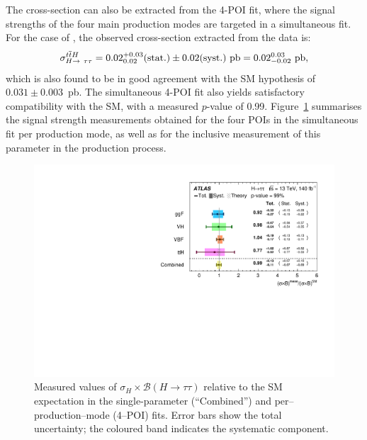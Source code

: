   The \ttHtt cross-section can also be extracted from the 4-POI fit, where the signal strengths of the four main production modes are targeted in a simultaneous fit. For the case of \ttH, the observed cross-section extracted from the data is:
\begin{equation}
  \sigma^{\ttH}_{H \to \tau \tau} 
  = 0.02^{+0.03}_{0.02}(\text{stat.}) \pm 0.02(\text{syst.})~\text{pb} 
  = 0.02^{0.03}_{-0.02}~\text{pb},
\end{equation}
which is also found to be in good agreement with the SM hypothesis of $0.031 \pm 0.003$~pb. The simultaneous 4-POI fit also yields satisfactory compatibility with the SM, with a measured $p$-value of 0.99. Figure~\ref{fig:permode_mu} summarises the signal strength measurements obtained for the four POIs in the simultaneous fit per production mode, as well as for the inclusive measurement of this parameter in the \htautau production process.

\begin{figure}[htbp]
  \centering
  \includegraphics[width=0.75\linewidth]{images/fit_stxs/4_poi_stxs.pdf} %
  \caption{Measured values of \(\sigma_H \times \mathcal{B}(H\!\to\!\tau\tau)\) relative to the SM expectation
  in the single-parameter (``Combined'') and per–production–mode (4–POI) fits.
  Error bars show the total uncertainty; the coloured band indicates the systematic component.}
  \label{fig:permode_mu}
\end{figure}



